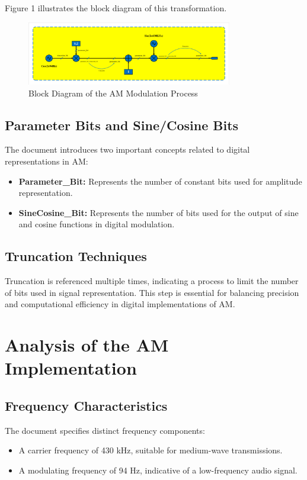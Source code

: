 \documentclass[paper=a4, fontsize=11pt, onecolumn]{scrartcl}	 %
\begin{document}
Figure 1 illustrates the block diagram of this transformation.

\begin{figure}[ht]
    \centering
  \includegraphics[width=0.8\textwidth]{AM_Modulation.pdf}
  \caption{Block Diagram of the AM Modulation Process}
  \label{fig:Block}
\end{figure}

\subsection*{Parameter Bits and Sine/Cosine Bits}
The document introduces two important concepts related to digital representations in AM:
\begin{itemize}
    \item \textbf{Parameter\_Bit:} Represents the number of constant bits used for amplitude representation.
    \item \textbf{SineCosine\_Bit:} Represents the number of bits used for the output of sine and cosine functions in digital modulation.
\end{itemize}

\subsection*{Truncation Techniques}
Truncation is referenced multiple times, indicating a process to limit the number of bits used in signal representation. This step is essential for balancing precision and computational 
efficiency in digital implementations of AM.

\section*{Analysis of the AM Implementation}

\subsection*{Frequency Characteristics}
The document specifies distinct frequency components:
\begin{itemize}
    \item A carrier frequency of 430 kHz, suitable for medium-wave transmissions.
    \item A modulating frequency of 94 Hz, indicative of a low-frequency audio signal.
\end{itemize}
\end{document}
